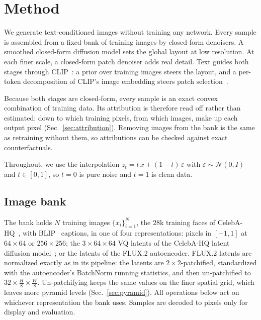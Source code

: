 \section{Method}
\label{sec:method}

We generate text-conditioned images without training any network. Every sample is assembled from a fixed bank of training images by closed-form denoisers. A smoothed closed-form diffusion model sets the global layout at low resolution. At each finer scale, a closed-form patch denoiser adds real detail. Text guides both stages through CLIP~\cite{radford2021clip}: a prior over training images steers the layout, and a per-token decomposition of CLIP's image embedding steers patch selection~\cite{gandelsman2024interpreting}.

Because both stages are closed-form, every sample is an exact convex combination of training data. Its attribution is therefore read off rather than estimated: down to which training pixels, from which images, make up each output pixel (Sec.~\ref{sec:attribution}). Removing images from the bank is the same as retraining without them, so attributions can be checked against exact counterfactuals.

Throughout, we use the interpolation $z_t = t\,x + (1-t)\,\varepsilon$ with $\varepsilon\sim\mathcal N(0,I)$ and $t\in[0,1]$, so $t=0$ is pure noise and $t=1$ is clean data.

\subsection{Image bank}
\label{sec:bank}

The bank holds $N$ training images $\{x_i\}_{i=1}^N$, the $28$k training faces of CelebA-HQ~\cite{karras2018progressive}, with BLIP~\cite{li2022blip} captions, in one of four representations: pixels in $[-1,1]$ at $64\times64$ or $256\times256$; the $3\times64\times64$ VQ latents of the CelebA-HQ latent diffusion model~\cite{rombach2022ldm}; or the latents of the FLUX.2 autoencoder. FLUX.2 latents are normalized exactly as in its pipeline: the latents are $2\times2$-patchified, standardized with the autoencoder's BatchNorm running statistics, and then un-patchified to $32\times\frac H8\times\frac W8$. Un-patchifying keeps the same values on the finer spatial grid, which leaves more pyramid levels (Sec.~\ref{sec:pyramid}). All operations below act on whichever representation the bank uses. Samples are decoded to pixels only for display and evaluation.

